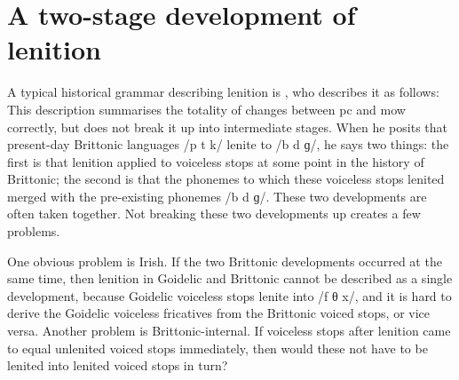 \section{A two-stage development of lenition}
\label{sec:two-stage-devel}
A typical historical grammar describing lenition is \textcite{Mor_Welsh13}, who describes it as follows:
This description summarises the totality of changes between \gls{pc} and \gls{mow} correctly, but does not break it up into intermediate stages. 
When he posits that present-day Brittonic languages /p t k/ lenite to /b d ɡ/, he says two things: the first is that lenition applied to voiceless stops at some point in the history of Brittonic; the second is that the phonemes to which these voiceless stops lenited merged with the pre-existing phonemes /b d ɡ/. These two developments are often taken together.  Not breaking these two developments up creates a few problems.

One obvious problem is Irish. If the two Brittonic developments occurred at the same time, then lenition in Goidelic and Brittonic cannot be described as a single development, because Goidelic voiceless stops lenite into /f θ x/, and it is hard to derive the Goidelic  voiceless fricatives from the Brittonic voiced stops, or vice versa. Another problem is Brittonic-internal. If voiceless stops after lenition came to equal unlenited voiced stops immediately, then would these not have to be lenited into lenited voiced stops in turn? 

